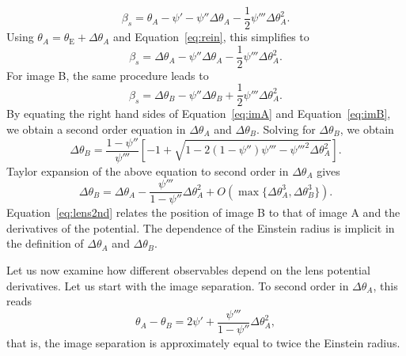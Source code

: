 \documentclass[usenatbib]{mnras}
\def\psii{\psi'}
\def\psiii{\psi''}
\def\psiiii{\psi'''}
\def\psiiiisq{\psi'''^{2}}
\def\tein{\theta_{\mathrm{E}}}
\def\Eref#1{Equation~\ref{#1}\xspace}
\begin{document}
\begin{equation}
\beta_s = \theta_A - \psii - \psiii \Delta\theta_A - \frac12 \psiiii \Delta\theta_A^2.
\end{equation}
Using $\theta_A = \tein + \Delta\theta_A$ and \Eref{eq:rein}, this simplifies to
\begin{equation}\label{eq:imA}
\beta_s = \Delta\theta_A - \psiii \Delta\theta_A - \frac12 \psiiii \Delta\theta_A^2.
\end{equation}
For image B, the same procedure leads to
\begin{equation}\label{eq:imB}
\beta_s = \Delta\theta_B - \psiii \Delta\theta_B + \frac12 \psiiii \Delta\theta_A^2.
\end{equation}
By equating the right hand sides of \Eref{eq:imA} and \Eref{eq:imB}, we obtain a second order equation in $\Delta\theta_A$ and $\Delta\theta_B$.
Solving for $\Delta\theta_B$, we obtain
\begin{equation}
\Delta\theta_B = \frac{1-\psiii}{\psiiii}\left[-1 + \sqrt{1 - 2(1-\psiii)\psiiii - \psiiiisq\Delta\theta_A^2}\right].
\end{equation}
Taylor expansion of the above equation to second order in $\Delta\theta_A$ gives
\begin{equation}\label{eq:lens2nd}
\Delta\theta_B = \Delta\theta_A - \frac{\psiiii}{1-\psiii}\Delta\theta_A^2 + O(\max{\{\Delta\theta_A^3, \Delta\theta_B^3\}}).
\end{equation}
%
\Eref{eq:lens2nd} relates the position of image B to that of image A and the derivatives of the potential.
The dependence of the Einstein radius is implicit in the definition of $\Delta\theta_A$ and $\Delta\theta_B$.

Let us now examine how different observables depend on the lens potential derivatives.
Let us start with the image separation. To second order in $\Delta\theta_A$, this reads
\begin{equation}\label{eq:imsep}
\theta_A - \theta_B = 2\psii + \frac{\psiiii}{1-\psiii}\Delta\theta_A^2,
\end{equation}
that is, the image separation is approximately equal to twice the Einstein radius.
\end{document}
